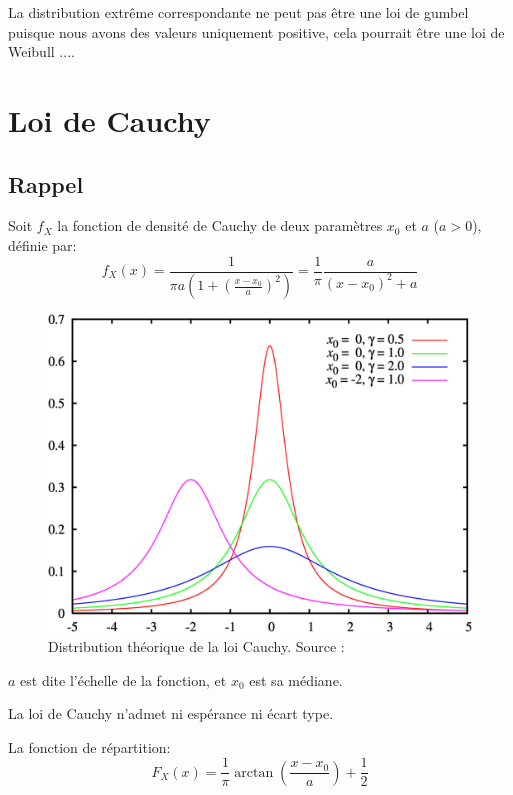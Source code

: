 \documentclass[12pt,a4paper,titlepage]{article}
\numberwithin{equation}{section}
\begin{document}
La distribution extrême correspondante ne peut pas être une loi de gumbel puisque nous avons des valeurs uniquement positive, cela pourrait être une loi de Weibull ....

\newpage


\section{Loi de Cauchy}
\subsection{Rappel}
Soit $f_X$ la fonction de densité de Cauchy de deux paramètres $x_0$ et $a$ ($a>0$), définie par:
\begin{equation}
\label{dCauchy}
{f_X}\left( x \right) = \frac{1}{{\pi a\left( {1 + {{\left( {\frac{{x - {x_0}}}{a}} \right)}^2}} \right)}} = \frac{1}{\pi }\frac{a}{{{{\left( {x - {x_0}} \right)}^2} + a}}
\end{equation}

\begin{figure}[h]
\includegraphics[width=\linewidth]{images/Cauchy_distribution_theoretic.png}
\caption{Distribution théorique de la loi Cauchy. Source : \cite{WikiLoiCauchy}}
\end{figure}

$a$ est dite l'échelle de la fonction, et $x_0$ est sa médiane.

La loi de Cauchy n'admet ni espérance ni écart type.

La fonction de répartition:
\begin{equation}
\label{rCauchy}
{F_X}\left( x \right) = \frac{1}{\pi }\arctan \left( {\frac{{x - {x_0}}}{a}} \right) + \frac{1}{2}
\end{equation}
\end{document}
